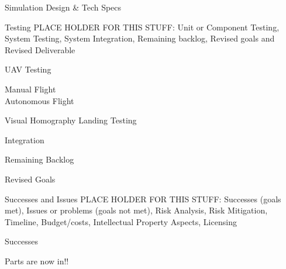 \documentclass[11pt]{beamer}
\begin{document}
\begin{frame}{Simulation Design \& Tech Specs}

\end{frame}



\begin{frame}{Testing}
PLACE HOLDER FOR THIS STUFF:
Unit or Component Testing,  System Testing,  System Integration,  Remaining backlog,  Revised goals
and Revised Deliverable
\end{frame}

\begin{frame}{UAV Testing}

Manual Flight \\
Autonomous Flight \\

\end{frame}

\begin{frame}{Visual Homography Landing Testing}

\end{frame}

\begin{frame}{Integration}

\end{frame}


\begin{frame}{Remaining Backlog}

\end{frame}


\begin{frame}{Revised Goals}

\end{frame}




\begin{frame}{Successes and Issues}
PLACE HOLDER FOR THIS STUFF:
Successes (goals met), Issues or problems (goals not met), Risk Analysis, Risk Mitigation, Timeline,
Budget/costs, Intellectual Property Aspects, Licensing
\end{frame}

\begin{frame}{Successes}

Parts are now in!!



\end{frame}
\end{document}

